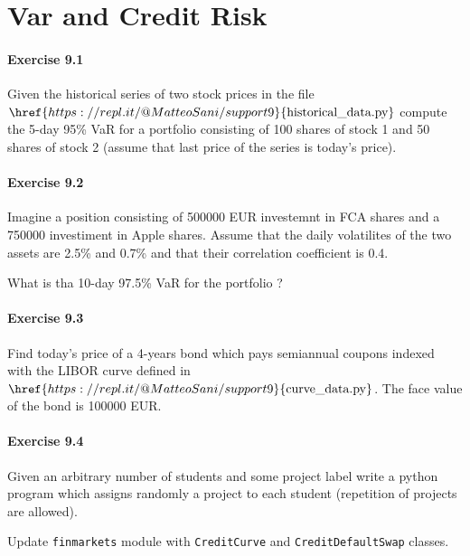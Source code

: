 \chapter{Var and Credit Risk}\label{lesson-13}


\hypertarget{exercise-9.1}{%
	\subsubsection{Exercise 9.1}\label{exercise-9.1}}

Given the historical series of two stock prices in the file
\(\href{https://repl.it/@MatteoSani/support9}{\textrm{historical\_data.py}}\)
compute the 5-day 95\% VaR for a portfolio consisting of 100 shares of
stock 1 and 50 shares of stock 2 (assume that last price of the series
is today's price).

\hypertarget{exercise-9.2}{%
	\subsubsection{Exercise 9.2}\label{exercise-9.2}}

Imagine a position consisting of 500000 EUR investemnt in FCA shares and
a 750000 investiment in Apple shares. Assume that the daily volatilites
of the two assets are 2.5\% and 0.7\% and that their correlation
coefficient is 0.4.

What is tha 10-day 97.5\% VaR for the portfolio ?

\hypertarget{exercise-9.3}{%
	\subsubsection{Exercise 9.3}\label{exercise-9.3}}
Find today's price of a 4-years bond which pays semiannual coupons indexed with the LIBOR curve defined in \(\href{https://repl.it/@MatteoSani/support9}{\textrm{curve\_data.py}}\). The face value of the bond is 100000 EUR.

\hypertarget{exercise-9.4}{%
	\subsubsection{Exercise 9.4}\label{exercise-9.4}}

Given an arbitrary number of students and some project label
write a python program which assigns randomly a project to each student
(repetition of projects are allowed).


\begin{Exercise}
Update \verb!finmarkets! module with \verb!CreditCurve! and \verb!CreditDefaultSwap! classes.
\end{Exercise}
\begin{Answer}
\end{Answer}
